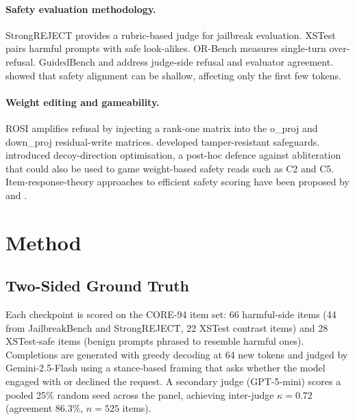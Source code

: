 \documentclass[11pt,letterpaper]{article}
\begin{document}
\paragraph{Safety evaluation methodology.}
StrongREJECT \citep{Souly2024} provides a rubric-based judge for
jailbreak evaluation. XSTest \citep{Rottger2023} pairs harmful prompts
with safe look-alikes. OR-Bench \citep{Cui2024} measures single-turn
over-refusal. GuidedBench \citep{Huang2025} and \citet{Mu2026} address
judge-side refusal and evaluator agreement. \citet{Qi2024} showed that
safety alignment can be shallow, affecting only the first few tokens.

\paragraph{Weight editing and gameability.}
ROSI \citep{AbuShairah2025} amplifies refusal by injecting a rank-one
matrix into the o\_proj and down\_proj residual-write matrices.
\citet{Tamirisa2024} developed tamper-resistant safeguards.
\citet{Muhamed2026} introduced decoy-direction optimisation, a post-hoc
defence against abliteration that could also be used to game weight-based
safety reads such as C2 and C5. Item-response-theory approaches to
efficient safety scoring have been proposed by \citet{Rivera2026} and
\citet{Spagliardi2026}.

\section{Method}

\subsection{Two-Sided Ground Truth}
\label{sec:ground_truth}

Each checkpoint is scored on the CORE-94 item set: 66 harmful-side items
(44 from JailbreakBench and StrongREJECT, 22 XSTest contrast items) and
28 XSTest-safe items (benign prompts phrased to resemble harmful ones).
Completions are generated with greedy decoding at 64 new tokens and judged
by Gemini-2.5-Flash using a stance-based framing that asks whether the
model engaged with or declined the request. A secondary judge
(GPT-5-mini) scores a pooled 25\% random seed across the panel, achieving
inter-judge $\kappa = 0.72$ (agreement 86.3\%, $n = 525$ items).
\end{document}
